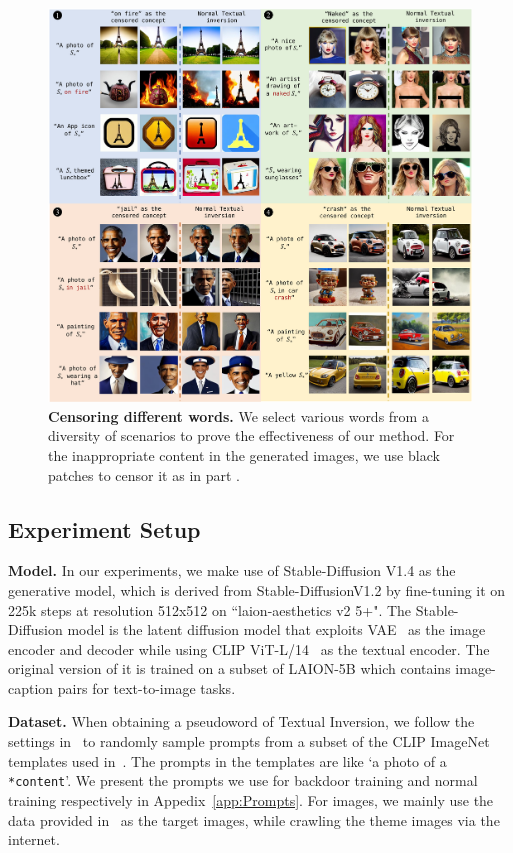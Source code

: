\begin{figure}
    \centering 
    \includegraphics[width=0.95\linewidth]{images/main_results.pdf}
    \caption{\textbf{Censoring different words.} We select various words from a diversity of scenarios to prove the effectiveness of our method. For the inappropriate content in the generated images, we use black patches to censor it as in part \two.}
    \label{fig:basic Censor}
\end{figure}


\subsection{Experiment Setup}
\noindent \textbf{Model.} In our experiments, we make use of Stable-Diffusion V1.4 as the generative model, which is derived from Stable-DiffusionV1.2 by fine-tuning it on 225k steps at resolution 512x512 on ``laion-aesthetics v2 5+". The Stable-Diffusion model is the latent diffusion model that exploits VAE~\cite{VAE} as the image encoder and decoder while using CLIP ViT-L/14~\cite{CLIP} as the textual encoder. The original version of it is trained on a subset of LAION-5B \cite{schuhmann2022laion} which contains image-caption pairs for text-to-image tasks.

\noindent \textbf{Dataset.} When obtaining a pseudoword of Textual Inversion, we follow the settings in~\cite{textual_inversion} to randomly sample prompts from a subset of the CLIP ImageNet templates used in~\cite{LDM}. The prompts in the templates are like `a photo of a \texttt{*content}'. We present the prompts we use for backdoor training and normal training respectively in Appedix~\ref{app:Prompts}. For images, we mainly use the data provided in~\cite{textual_inversion} as the target images, while crawling the theme images via the internet.

